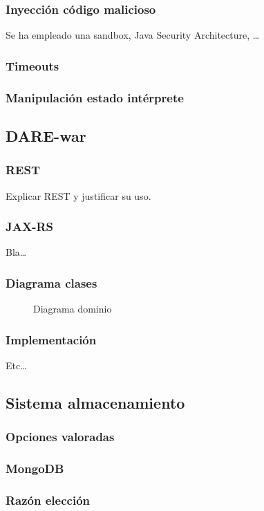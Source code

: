\subsubsection{Inyección código malicioso}
Se ha empleado una sandbox, Java Security Architecture, \ldots{}
\subsubsection{Timeouts}
\subsubsection{Manipulación estado intérprete}

\subsection{DARE-war}
\subsubsection{REST}
Explicar REST y justificar su uso.
\subsubsection{JAX-RS}
Bla\ldots
\subsubsection{Diagrama clases}
\begin{figure}[!hbp]
\makebox[\textwidth]{\framebox[5cm]{\rule{0pt}{5cm}}}
\caption{Diagrama dominio}
\end{figure}
\subsubsection{Implementación}
Etc\ldots

\subsection{Sistema almacenamiento}
\subsubsection{Opciones valoradas}
\subsubsection{MongoDB}
\subsubsection{Razón elección}
